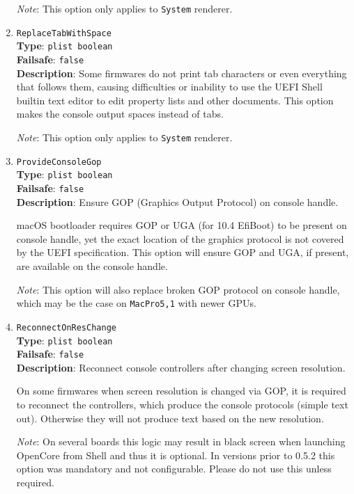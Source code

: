 \documentclass[]{article}
\begin{document}
\begin{enumerate}
  \emph{Note}: This option only applies to \texttt{System} renderer.

\item
  \texttt{ReplaceTabWithSpace}\\
  \textbf{Type}: \texttt{plist\ boolean}\\
  \textbf{Failsafe}: \texttt{false}\\
  \textbf{Description}: Some firmwares do not print tab characters or even everything
  that follows them, causing difficulties or inability to use the UEFI Shell builtin
  text editor to edit property lists and other documents. This option makes the console
  output spaces instead of tabs.

  \emph{Note}: This option only applies to \texttt{System} renderer.

\item
  \texttt{ProvideConsoleGop}\\
  \textbf{Type}: \texttt{plist\ boolean}\\
  \textbf{Failsafe}: \texttt{false}\\
  \textbf{Description}: Ensure GOP (Graphics Output Protocol) on console handle.

  macOS bootloader requires GOP or UGA (for 10.4 EfiBoot) to be present on console
  handle, yet the exact location of the graphics protocol is not covered by the
  UEFI specification. This option will ensure GOP and UGA, if present, are available
  on the console handle.

  \emph{Note}: This option will also replace broken GOP protocol on console handle,
  which may be the case on \texttt{MacPro5,1} with newer GPUs.

\item
  \texttt{ReconnectOnResChange}\\
  \textbf{Type}: \texttt{plist\ boolean}\\
  \textbf{Failsafe}: \texttt{false}\\
  \textbf{Description}: Reconnect console controllers after changing screen resolution.

  On some firmwares when screen resolution is changed via GOP, it is required to reconnect
  the controllers, which produce the console protocols (simple text out). Otherwise they
  will not produce text based on the new resolution.

  \emph{Note}: On several boards this logic may result in black screen when launching
  OpenCore from Shell and thus it is optional. In versions prior to 0.5.2 this option
  was mandatory and not configurable. Please do not use this unless required.


\end{enumerate}
\end{document}
